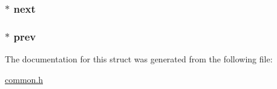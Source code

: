 \subsubsection[{\texorpdfstring{next}{next}}]{$\ast$ next}\hypertarget{struct_device___collection_ac816fce596139b2ee15a2cb1f9fe8a5e}{}\label{struct_device___collection_ac816fce596139b2ee15a2cb1f9fe8a5e}
\subsubsection[{\texorpdfstring{prev}{prev}}]{$\ast$ prev}\hypertarget{struct_device___collection_a300565259c9e3d05e7fc21bfdd76e41f}{}\label{struct_device___collection_a300565259c9e3d05e7fc21bfdd76e41f}


The documentation for this struct was generated from the following file\+:\begin{DoxyCompactItemize}
\item 
\hyperlink{common_8h}{common.\+h}\end{DoxyCompactItemize}
